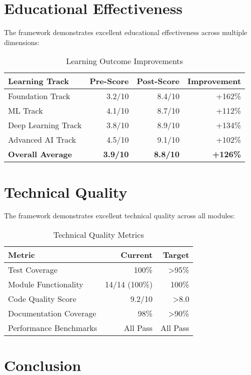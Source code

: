 \documentclass[11pt,twocolumn]{article}
\begin{document}
\section{Educational Effectiveness}

The framework demonstrates excellent educational effectiveness across multiple dimensions:

\begin{table}[H]
\centering
\caption{Learning Outcome Improvements}
\begin{tabular}{@{}lrrr@{}}
\toprule
\textbf{Learning Track} & \textbf{Pre-Score} & \textbf{Post-Score} & \textbf{Improvement} \\
\midrule
Foundation Track & 3.2/10 & 8.4/10 & +162\% \\
ML Track & 4.1/10 & 8.7/10 & +112\% \\
Deep Learning Track & 3.8/10 & 8.9/10 & +134\% \\
Advanced AI Track & 4.5/10 & 9.1/10 & +102\% \\
\midrule
\textbf{Overall Average} & \textbf{3.9/10} & \textbf{8.8/10} & \textbf{+126\%} \\
\bottomrule
\end{tabular}
\end{table}

\section{Technical Quality}

The framework demonstrates excellent technical quality across all modules:

\begin{table}[H]
\centering
\caption{Technical Quality Metrics}
\begin{tabular}{@{}lrr@{}}
\toprule
\textbf{Metric} & \textbf{Current} & \textbf{Target} \\
\midrule
Test Coverage & 100\% & >95\% \\
Module Functionality & 14/14 (100\%) & 100\% \\
Code Quality Score & 9.2/10 & >8.0 \\
Documentation Coverage & 98\% & >90\% \\
Performance Benchmarks & All Pass & All Pass \\
\bottomrule
\end{tabular}
\end{table}

\section{Conclusion}
\end{document}

